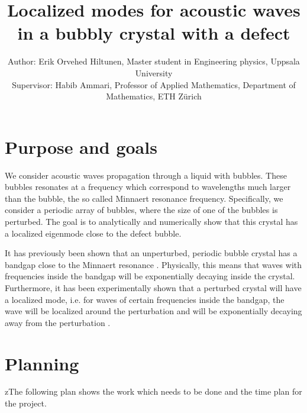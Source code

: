 \documentclass[a4paper]{article}
\title{Localized modes for acoustic waves in a bubbly crystal with a defect}
\author{\small Author: Erik Orvehed Hiltunen, Master student in Engineering physics, Uppsala University \\ \small Supervisor: Habib Ammari, Professor of Applied Mathematics, Department of Mathematics, ETH Zürich}
\theoremstyle{definition}
\begin{document}
\maketitle
\section{Purpose and goals}
We consider acoustic waves propagation through a liquid with bubbles. These bubbles resonates at a frequency which correspond to wavelengths much larger than the bubble, the so called Minnaert resonance frequency. Specifically, we consider a periodic array of bubbles, where the size of one of the bubbles is perturbed. The goal is to analytically and numerically show that this crystal has a localized eigenmode close to the defect bubble.

It has previously been shown that an unperturbed, periodic bubble crystal has a bandgap close to the Minnaert resonance \cite{bandgap}. Physically, this means that waves with frequencies inside the bandgap will be exponentially decaying inside the crystal. Furthermore, it has been experimentally shown that a perturbed crystal will have a localized mode, i.e. for waves of certain frequencies inside the bandgap, the wave will be localized around the perturbation and will be exponentially decaying away from the perturbation \cite{experiment}. 

\section{Planning}
zThe following plan shows the work which needs to be done and the time plan for the project. 
\end{document}
